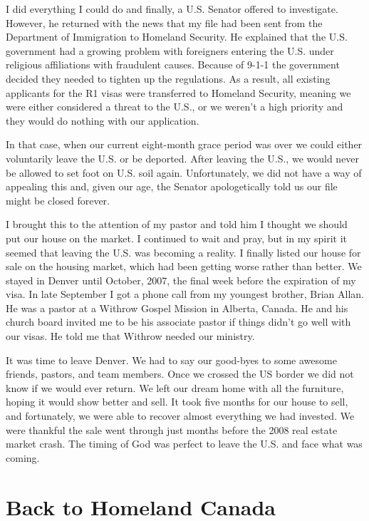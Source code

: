 \documentclass[twoside, 12pt]{book}
\begin{document}
I did everything I could do and finally, a U.S. Senator offered to investigate. However, he returned with the news that my file had been sent from the Department of Immigration to Homeland Security. He explained that the U.S. government had a growing problem with foreigners entering the U.S. under religious affiliations with fraudulent causes. Because of 9-1-1 the government decided they needed to tighten up the regulations. As a result, all existing applicants for the R1 visas were transferred to Homeland Security, meaning we were either considered a threat to the U.S., or we weren’t a high priority and they would do nothing with our application.

In that case, when our current eight-month grace period was over we could either voluntarily leave the U.S. or be deported. After leaving the U.S., we would never be allowed to set foot on U.S. soil again. Unfortunately, we did not have a way of appealing this and, given our age, the Senator apologetically told us our file might be closed forever.

I brought this to the attention of my pastor and told him I thought we should put our house on the market. I continued to wait and pray, but in my spirit it seemed that leaving the U.S. was becoming a reality. I finally listed our house for sale on the housing market, which had been getting worse rather than better. We stayed in Denver until October, 2007, the final week before the expiration of my visa. In late September I got a phone call from my youngest brother, Brian Allan. He was a pastor at a Withrow Gospel Mission in Alberta, Canada. He and his church board invited me to be his associate pastor if things didn’t go well with our visas. He told me that Withrow needed our ministry.

It was time to leave Denver. We had to say our good-byes to some awesome friends, pastors, and team members. Once we crossed the US border we did not know if we would ever return.  We left our dream home with all the furniture, hoping it would show better and sell. It took five months for our house to sell, and fortunately, we were able to recover almost everything we had invested. We were thankful the sale went through just months before the 2008 real estate market crash. The timing of God was perfect to leave the U.S. and face what was coming.



\section{Back to Homeland Canada}
\
\end{document}
